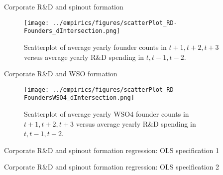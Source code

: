 \documentclass[english,usenames,dvipsnames]{beamer}
\begin{document}
\begin{frame}{Corporate R\&D and spinout formation}
\begin{figure}[!htb]
	\centering
	\texttt{[image: ../empirics/figures/scatterPlot\_RD-Founders\_dIntersection.png]}
	\caption{Scatterplot of average yearly founder counts in $t+1,t+2,t+3$ versus average yearly R\&D spending in $t,t-1,t-2$.}
\end{figure}
\end{frame}

\begin{frame}{Corporate R\&D and WSO formation}

\begin{figure}[!htb]
\centering
\texttt{[image: ../empirics/figures/scatterPlot\_RD-FoundersWSO4\_dIntersection.png]}
\caption{Scatterplot of average yearly WSO4 founder counts in $t+1,t+2,t+3$ versus average yearly R\&D spending in $t,t-1,t-2$.}
\end{figure}
\end{frame}

\begin{frame}{Corporate R\&D and spinout formation regression: OLS specification 1}
\begin{table}
\Tiny
\centering

\caption{\tiny The dependent variable is average yearly number of founders joining startups in years $t+1,t+2,t+3$. The independent variables are averages over $t,t-1,t-2$. Firm controls are employment, assets, intangible assets, investment, net income, cumulative citation-weighted patents, and the product of Tobin's Q and Assets. Standard errors are clustered by firm.}
\end{table}
\end{frame}

\begin{frame}{Corporate R\&D and spinout formation regression: OLS specification 2}
\begin{table}
\Tiny
\centering

\caption{\tiny The dependent variable is the average yearly number of founders from the parent firm joining startups in years $t+1,t+2,t+3$, normalized by a trailing five-year moving average of assets. Independent variables are also normalized by assets. Standard errors are clustered at the firm level.}
\label{table:RDandSpinoutFormation_at_founder2_l3f3}
\end{table}
\end{frame}
\end{document}
